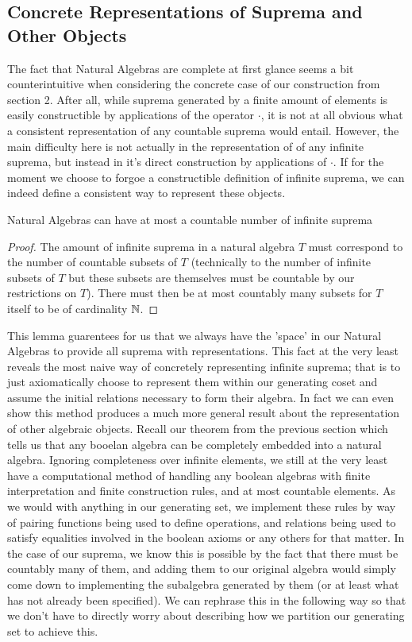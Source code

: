 \documentclass[12pt]{amsart}
\begin{document}
\subsection{Concrete Representations of Suprema and Other Objects}

The fact that Natural Algebras are complete at first glance seems a bit counterintuitive when considering the concrete case of our construction from section 2. After all, while suprema generated by a finite amount of elements is easily constructible by applications of the operator $\cdot$, it is not at all obvious what a consistent representation of any countable suprema would entail. However, the main difficulty here is not actually in the representation of of any infinite suprema, but instead in it's direct construction by applications of $\cdot$. If for the moment we choose to forgoe a constructible definition of infinite suprema, we can indeed define a consistent way to represent these objects.
\begin{lem}
	Natural Algebras can have at most a countable number of infinite suprema
\end{lem}
\begin{proof}
	The amount of infinite suprema in a natural algebra $T$ must correspond to the number of countable subsets of $T$ (technically to the number of infinite subsets of $T$ but these subsets are themselves must be countable by our restrictions on $T$). There must then be at most countably many subsets for $T$ itself to be of cardinality $\mathbb{N}$.
\end{proof}


This lemma guarentees for us that we always have the 'space' in our Natural Algebras to provide all suprema with representations. This fact at the very least reveals the most naive way of concretely representing infinite suprema; that is to just axiomatically choose to represent them within our generating coset and assume the initial relations necessary to form their algebra. In fact we can even show this method produces a much more general result about the representation of other algebraic objects. Recall our theorem from the previous section which tells us that any booelan algebra can be completely embedded into a natural algebra. Ignoring completeness over infinite elements, we still at the very least have a computational method of handling any boolean algebras with finite interpretation and finite construction rules, and at most countable elements. As we would with anything in our generating set, we implement these rules by way of pairing functions being used to define operations, and relations being used to satisfy equalities involved in the boolean axioms or any others for that matter. In the case of our suprema, we know this is possible by the fact that there must be countably many of them, and adding them to our original algebra would simply come down to implementing the subalgebra generated by them (or at least what has not already been specified). We can rephrase this in the following way so that we don't have to directly worry about describing how we partition our generating set to achieve this.
\end{document}
